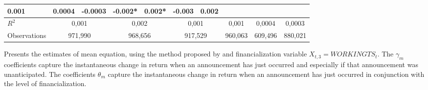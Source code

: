 \begin{landscape}
\begin{table}[]
{\begin{tabular}{lllllllllllll}
  0.001 &
  0.0004 &
  -0.0003 &
  -0.002* &
  0.002* &
  -0.003 &
  0.002 \\ \hline
$R^2$ &
  \multicolumn{2}{c}{0,001} &
  \multicolumn{2}{c}{0,002} &
  \multicolumn{2}{c}{0,001} &
  \multicolumn{2}{c}{0,001} &
  \multicolumn{2}{c}{0,0004} &
  \multicolumn{2}{c}{0,0003} \\
Observations &
  \multicolumn{2}{c}{971,990} &
  \multicolumn{2}{c}{968,656} &
  \multicolumn{2}{c}{917,529} &
  \multicolumn{2}{c}{960,063} &
  \multicolumn{2}{c}{609,496} &
  \multicolumn{2}{c}{880,021} \\ \hline
\end{tabular}%
}
\singlespacing
        \footnotesize
 Presents the estimates of mean equation, using the method proposed by \citep{kurov2019price} and financialization variable $X_{t,3}=WORKINGTS_t$. The $\gamma_m$ coefficients capture the instantaneous change in return when an announcement has just occurred and especially if that announcement was unanticipated. The coefficients $\theta_m$ capture the instantaneous change in return when an announcement has just occurred in conjunction with the level of financialization.
\end{table}
\end{landscape}

